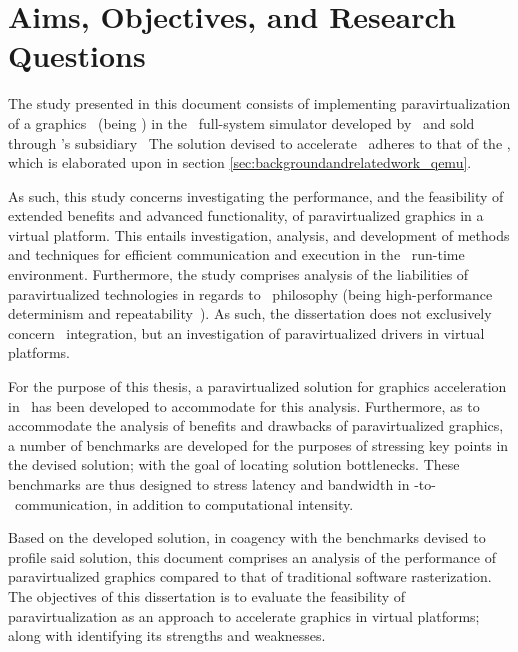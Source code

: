 
\chapter{Aims, Objectives, and Research Questions}
\label{cha:aimsandobjectives}
The study presented in this document consists of implementing paravirtualization of a graphics \dvttermapi\ (being \dvttermopenglestwopointo ) in the \dvttermsimics\ full-system simulator developed by \dvttermintel\ and sold through \dvttermintel 's subsidiary \dvttermwindriver\ 
The solution devised to accelerate \dvttermopengl\ adheres to that of the \dvttermandroidemulator , which is elaborated upon in section \ref{sec:backgroundandrelatedwork_qemu}.

As such, this study concerns investigating the performance, and the feasibility of extended benefits and advanced functionality, of paravirtualized graphics in a virtual platform.
This entails investigation, analysis, and development of methods and techniques for efficient communication and execution in the \dvttermsimics\ run-time environment.
Furthermore, the study comprises analysis of the liabilities of paravirtualized technologies in regards to \dvttermsimics\ philosophy (being high-performance determinism and repeatability~).
As such, the dissertation does not exclusively concern \dvttermsimics\ integration, but an investigation of paravirtualized drivers in virtual platforms.

For the purpose of this thesis, a paravirtualized solution for graphics acceleration in \dvttermsimics\ has been developed to accommodate for this analysis.
Furthermore, as to accommodate the analysis of benefits and drawbacks of paravirtualized graphics, a number of benchmarks are developed for the purposes of stressing key points in the devised solution; with the goal of locating solution bottlenecks.
These benchmarks are thus designed to stress latency and bandwidth in \dvttermtarget -to-\dvttermhost\ communication, in addition to computational intensity.

Based on the developed solution, in coagency with the benchmarks devised to profile said solution, this document comprises an analysis of the performance of paravirtualized graphics compared to that of traditional software rasterization.
The objectives of this dissertation is to evaluate the feasibility of paravirtualization as an approach to accelerate graphics in virtual platforms; along with identifying its strengths and weaknesses.

